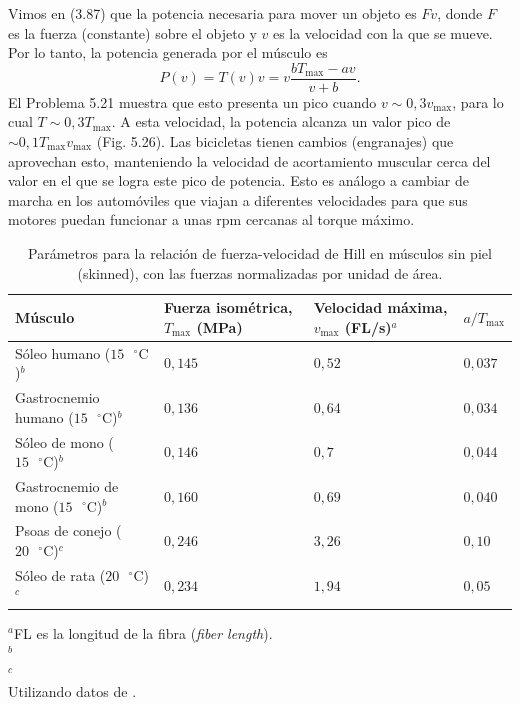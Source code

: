 \documentclass[12pt]{book}
\begin{document}
Vimos en (3.87) que la potencia necesaria para mover un objeto es $Fv$, donde $F$ es la fuerza (constante) sobre el objeto y $v$ es la velocidad con la que se mueve. Por lo tanto, la potencia generada por el músculo es
\begin{equation}
P(v) = T(v)v = v \frac{b T_{\text{max}} - a v}{v + b}.
\label{eq:5.23}
\end{equation}
El Problema 5.21 muestra que esto presenta un pico cuando $v \sim 0{,}3 v_{\text{max}}$, para lo cual $T \sim 0{,}3 T_{\text{max}}$. A esta velocidad, la potencia alcanza un valor pico de $\sim 0{,}1 T_{\text{max}} v_{\text{max}}$ (Fig. 5.26). Las bicicletas tienen cambios (engranajes) que aprovechan esto, manteniendo la velocidad de acortamiento muscular cerca del valor en el que se logra este pico de potencia. Esto es análogo a cambiar de marcha en los automóviles que viajan a diferentes velocidades para que sus motores puedan funcionar a unas rpm cercanas al torque máximo.

\begin{table}[htbp]
\centering
\caption{Parámetros para la relación de fuerza-velocidad de Hill en músculos sin piel (skinned), con las fuerzas normalizadas por unidad de área.}
\label{tab:59}
\small
\begin{tabularx}{\textwidth}{X >{\centering\arraybackslash}X >{\centering\arraybackslash}X >{\centering\arraybackslash}X}
\toprule
\textbf{Músculo} & \textbf{Fuerza isométrica, $T_{\text{max}}$ (MPa)} & \textbf{Velocidad máxima, $v_{\text{max}}$ (FL/s)$^a$} & \textbf{$a/T_{\text{max}}$} \\
\midrule
Sóleo humano ($15\text{ }^\circ\text{C}$)$^b$ & $0{,}145$ & $0{,}52$ & $0{,}037$ \\
Gastrocnemio humano ($15\text{ }^\circ\text{C}$)$^b$ & $0{,}136$ & $0{,}64$ & $0{,}034$ \\
Sóleo de mono ($15\text{ }^\circ\text{C}$)$^b$ & $0{,}146$ & $0{,}7$ & $0{,}044$ \\
Gastrocnemio de mono ($15\text{ }^\circ\text{C}$)$^b$ & $0{,}160$ & $0{,}69$ & $0{,}040$ \\
Psoas de conejo ($20\text{ }^\circ\text{C}$)$^c$ & $0{,}246$ & $3{,}26$ & $0{,}10$ \\
Sóleo de rata ($20\text{ }^\circ\text{C}$)$^c$ & $0{,}234$ & $1{,}94$ & $0{,}05$ \\
\bottomrule
\end{tabularx}
\begin{flushleft}
    \small $^a$FL es la longitud de la fibra (\textit{fiber length}). \\
    $^b$\cite{77} \\
    $^c$\cite{75} \\
    Utilizando datos de \cite{51}.
\end{flushleft}
\end{table}
\end{document}
